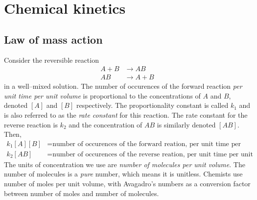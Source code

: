 \documentclass[10pt]{article}
\begin{document}
\newpage
\section{Chemical kinetics}

\subsection{Law of mass action}

Consider the reversible reaction
\begin{align*}
A + B &\rightarrow AB \\
AB &\rightarrow A + B
\end{align*}
in a well--mixed solution.  The number of occurences of the forward reaction {\em per unit time per unit volume} is proportional to the concentrations of $A$ and $B$, denoted $[A]$ and $[B]$ respectively.  The proportionality constant is called $k_1$ and is also referred to as the {\em rate constant} for this reaction.  The rate constant for the reverse reaction is $k_2$ and the concentration of $AB$ is similarly denoted $[AB]$.  Then,
\begin{align*}
k_1[A][B] &= \text{number of occurences of the forward reation, per unit time per unit volume} \\
k_2[AB] &=  \text{number of occurences of the reverse reation, per unit time per unit volume}
\end{align*}  
The units of concentration we use are {\em number of molecules per unit volume}.  The number of molecules is a {\em pure} number, which means it is unitless.  Chemists use number of moles per unit volume, with Avagadro's numbers as a conversion factor between number of moles and number of molecules. 
\end{document}
